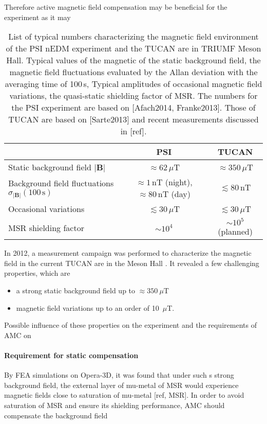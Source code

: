 Therefore active  magnetic field compensation may be beneficial for the experiment as it may 



\begin{table}[ht]
\centering 
\begin{tabular}{|l||c|c|}
\hline

 & \multicolumn{1}{c|}{\textbf{PSI}} & \multicolumn{1}{c|}{\textbf{TUCAN}} \\ \hline\hline 
Static background field $| \bm{B}|$ & $\approx62\,\mu$T     & $\approx 350\,\mu$T                       \\ \hline
Background field fluctuations  $\sigma_{|\mathbf{B}|}(100\,\mathrm{s})$ & $\approx 1\,\mathrm{nT}$ (night), $\approx 80\,\mathrm{nT}$ (day) & $\lesssim 80\,\mathrm{nT}$ \\ \hline
Occasional variations    & $\lesssim30\,\mu$T         & $\lesssim 30\,\mu$T            \\ \hline
 MSR shielding  factor       &    $\sim 10^4$   &   $\sim 10^5$ (planned)  \\ \hline 
\end{tabular}
\caption{List of typical numbers characterizing the magnetic field environment of the PSI nEDM experiment and the TUCAN are in TRIUMF Meson Hall. Typical values of the magnetic of the static background field, the magnetic field fluctuations evaluated by the Allan deviation with the averaging time of 100\,s, Typical amplitudes of occasional magnetic field variations, the quasi-static shielding factor of MSR. The numbers for the PSI experiment are based on [Afach2014, Franke2013]. Those of TUCAN are based on [Sarte2013] and recent measurements discussed in [ref]. 
}
\label{tab:amc_comparaion}
\end{table}



 


In 2012, a measurement campaign was performed to characterize the magnetic field in the current TUCAN are in the Meson Hall \cite{Sarte}. It revealed a few challenging properties, which are 
\begin{itemize}
\item a strong static background field up to $\approx 350~\mu$T
\item magnetic field variations up to an order of 10~$\mu$T.
\end{itemize}
Possible influence of these properties on the experiment and the requirements of  AMC on 
\paragraph*{Requirement for static compensation }
By FEA simulations on Opera-3D, it was found that under such s strong background field, the external layer of mu-metal of MSR would experience magnetic fields close to saturation of mu-metal [ref, MSR]. In order to avoid saturation of MSR and ensure its shielding performance,  AMC should compensate the background field 
